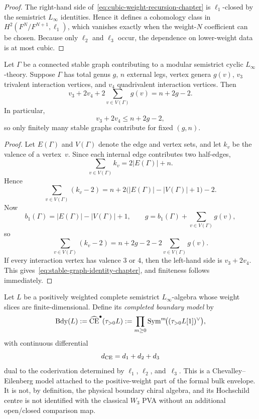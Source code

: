 \begin{proof}
The right-hand side of~\eqref{eq:cubic-weight-recursion-chapter} is $\ell_1$-closed by the semistrict $L_\infty$ identities. Hence it defines a cohomology class in $H^2(F^N/F^{N+1},\ell_1)$, which vanishes exactly when the weight-$N$ coefficient can be chosen. Because only $\ell_2$ and $\ell_3$ occur, the dependence on lower-weight data is at most cubic.\qedhere
\end{proof}

\begin{proposition}
\label{prop:stable-graph-identity-chapter}
Let $\Gamma$ be a connected stable graph contributing to a modular semistrict cyclic $L_\infty$-theory. Suppose $\Gamma$ has total genus $g$, $n$ external legs, vertex genera $g(v)$, $v_3$ trivalent interaction vertices, and $v_4$ quadrivalent interaction vertices. Then
\begin{equation}
\label{eq:stable-graph-identity-chapter}
v_3+2v_4+2\sum_{v\in V(\Gamma)}g(v)=n+2g-2.
\end{equation}
In particular,
\[
v_3+2v_4\le n+2g-2,
\]
so only finitely many stable graphs contribute for fixed $(g,n)$.
\end{proposition}

\begin{proof}
Let $E(\Gamma)$ and $V(\Gamma)$ denote the edge and vertex sets, and let $k_v$ be the valence of a vertex~$v$. Since each internal edge contributes two half-edges,
\[
\sum_{v\in V(\Gamma)}k_v=2|E(\Gamma)|+n.
\]
Hence
\[
\sum_{v\in V(\Gamma)}(k_v-2)
=n+2\bigl(|E(\Gamma)|-|V(\Gamma)|+1\bigr)-2.
\]
Now
\[
b_1(\Gamma)=|E(\Gamma)|-|V(\Gamma)|+1,
\qquad
g=b_1(\Gamma)+\sum_{v\in V(\Gamma)}g(v),
\]
so
\[
\sum_{v\in V(\Gamma)}(k_v-2)
=
 n+2g-2-2\sum_{v\in V(\Gamma)}g(v).
\]
If every interaction vertex has valence $3$ or $4$, then the left-hand side is $v_3+2v_4$. This gives~\eqref{eq:stable-graph-identity-chapter}, and finiteness follows immediately.\qedhere
\end{proof}

\begin{definition}
\label{def:completed-boundary-model-chapter}
Let $L$ be a positively weighted complete semistrict $L_\infty$-algebra whose weight slices are finite-dimensional. Define its \emph{completed boundary model} by
\[
\operatorname{Bdy}(L):=\widehat{\operatorname{CE}}^{\bullet}(\tau_{>0}L)
:=
\prod_{m\ge 0}\operatorname{Sym}^m\!\bigl((\tau_{>0}L[1])^{\vee}\bigr),
\]
with continuous differential
\[
d_{\operatorname{CE}}=d_1+d_2+d_3
\]
dual to the coderivation determined by $\ell_1$, $\ell_2$, and~$\ell_3$.
This is a Chevalley--Eilenberg model attached to the positive-weight
part of the formal bulk envelope. It is not, by definition, the physical
boundary chiral algebra, and its Hochschild centre is not identified
with the classical $W_3$ PVA without an additional open/closed
comparison map.
\end{definition}

